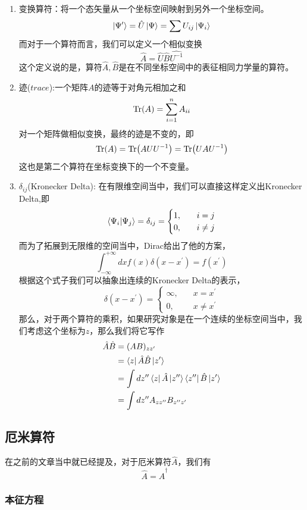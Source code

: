 \documentclass{article}
\begin{document}
\begin{enumerate}
    \item 变换算符：将一个态矢量从一个坐标空间映射到另外一个坐标空间。
    \[\ket{\Psi^\prime}=\hat{U}\ket{\Psi}=\sum U_{ij}\ket{\Psi_{i}}\]
    而对于一个算符而言，我们可以定义一个相似变换
    \[\hat{A}=\hat{U}\hat{B}\hat{U^{-1}}\]
    这个定义说的是，算符$\hat{A},\hat{B}$是在不同坐标空间中的表征相同力学量的算符。
    \item 迹($trace$):一个矩阵$A$的迹等于对角元相加之和
    \[\Tr(A)=\sum_{i=1}^{n} A_{ii}\]
    对一个矩阵做相似变换，最终的迹是不变的，即
    \[\Tr(A)=\Tr(AUU^{-1})=\Tr(UAU^{-1})\]
    这也是第二个算符在坐标变换下的一个不变量。
    \item $\delta_{ij}$(Kronecker Delta):
    在有限维空间当中，我们可以直接这样定义出Kronecker Delta,即
    \[
    \braket{\Psi_i}{\Psi_j}=\delta_{ij}=
    \begin{cases}
        1,&\quad i=j\\
        0,&\quad i\neq j
    \end{cases}
    \]
    而为了拓展到无限维的空间当中，Dirac给出了他的方案，
    \[\int_{-\infty}^{+\infty}dx f(x) \delta(x-x^\prime)=f(x^\prime)\]
    根据这个式子我们可以抽象出连续的Kronecker Delta的表示，
    \[
        \delta(x-x^\prime)=
        \begin{cases}
            \infty,&\quad x=x^\prime\\
            0,&\quad x\neq x^\prime
        \end{cases}
    \]
    那么，对于两个算符的乘积，如果研究对象是在一个连续的坐标空间当中，我们考虑这个坐标为$z$，那么我们将它写作
    \begin{align*}
        \hat{A}\hat{B}&=(AB)_{zz^\prime}\\
        &=\bra{z}\hat{A}\hat{B}\ket{z^\prime}\\
        &=\int dz^{\prime\prime}\bra{z}\hat{A}\ket{z^{\prime\prime}}\bra{z^{\prime\prime}}\hat{B}\ket{z^\prime}\\
        &=\int dz^{\prime\prime}A_{zz^{\prime\prime}}B_{z^{\prime\prime}z^\prime}
    \end{align*}
\end{enumerate}


\subsection{厄米算符}

在之前的文章当中就已经提及，对于厄米算符$\hat{A}$，我们有
\[\hat{A}=\hat{A}^\dagger\]

\subsubsection{本征方程}
\end{document}
